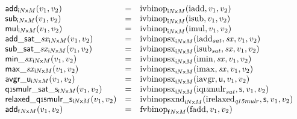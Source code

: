 $$
\begin{array}[t]{@{}lcl@{}l@{}}
{\mathsf{add}}{{}_{{{\mathsf{i}}{N}}{\mathsf{x}}{M}}(v_1, v_2)} & = & {{\mathrm{ivbinop}}}_{{{\mathsf{i}}{N}}{\mathsf{x}}{M}}({\mathrm{iadd}}, v_1, v_2) \\
{\mathsf{sub}}{{}_{{{\mathsf{i}}{N}}{\mathsf{x}}{M}}(v_1, v_2)} & = & {{\mathrm{ivbinop}}}_{{{\mathsf{i}}{N}}{\mathsf{x}}{M}}({\mathrm{isub}}, v_1, v_2) \\
{\mathsf{mul}}{{}_{{{\mathsf{i}}{N}}{\mathsf{x}}{M}}(v_1, v_2)} & = & {{\mathrm{ivbinop}}}_{{{\mathsf{i}}{N}}{\mathsf{x}}{M}}({\mathrm{imul}}, v_1, v_2) \\
{{\mathsf{add\_sat}}{\mathsf{\_}}{{\mathit{sx}}}}{{}_{{{\mathsf{i}}{N}}{\mathsf{x}}{M}}(v_1, v_2)} & = & {{\mathrm{ivbinopsx}}}_{{{\mathsf{i}}{N}}{\mathsf{x}}{M}}({\mathrm{iadd}}_{{\mathit{sat}}}, {\mathit{sx}}, v_1, v_2) \\
{{\mathsf{sub\_sat}}{\mathsf{\_}}{{\mathit{sx}}}}{{}_{{{\mathsf{i}}{N}}{\mathsf{x}}{M}}(v_1, v_2)} & = & {{\mathrm{ivbinopsx}}}_{{{\mathsf{i}}{N}}{\mathsf{x}}{M}}({\mathrm{isub}}_{{\mathit{sat}}}, {\mathit{sx}}, v_1, v_2) \\
{{\mathsf{min}}{\mathsf{\_}}{{\mathit{sx}}}}{{}_{{{\mathsf{i}}{N}}{\mathsf{x}}{M}}(v_1, v_2)} & = & {{\mathrm{ivbinopsx}}}_{{{\mathsf{i}}{N}}{\mathsf{x}}{M}}({\mathrm{imin}}, {\mathit{sx}}, v_1, v_2) \\
{{\mathsf{max}}{\mathsf{\_}}{{\mathit{sx}}}}{{}_{{{\mathsf{i}}{N}}{\mathsf{x}}{M}}(v_1, v_2)} & = & {{\mathrm{ivbinopsx}}}_{{{\mathsf{i}}{N}}{\mathsf{x}}{M}}({\mathrm{imax}}, {\mathit{sx}}, v_1, v_2) \\
{{\mathsf{avgr}}{\mathsf{\_}}{\mathsf{u}}}{{}_{{{\mathsf{i}}{N}}{\mathsf{x}}{M}}(v_1, v_2)} & = & {{\mathrm{ivbinopsx}}}_{{{\mathsf{i}}{N}}{\mathsf{x}}{M}}({\mathrm{iavgr}}, \mathsf{u}, v_1, v_2) \\
{{\mathsf{q{\scriptstyle 15}mulr\_sat}}{\mathsf{\_}}{\mathsf{s}}}{{}_{{{\mathsf{i}}{N}}{\mathsf{x}}{M}}(v_1, v_2)} & = & {{\mathrm{ivbinopsx}}}_{{{\mathsf{i}}{N}}{\mathsf{x}}{M}}({\mathrm{iq{\kern-0.1em\scriptstyle 15\kern-0.1em}mulr}}_{{\mathit{sat}}}, \mathsf{s}, v_1, v_2) \\
{{\mathsf{relaxed\_q{\scriptstyle 15}mulr}}{\mathsf{\_}}{\mathsf{s}}}{{}_{{{\mathsf{i}}{N}}{\mathsf{x}}{M}}(v_1, v_2)} & = & {{\mathrm{ivbinopsxnd}}}_{{{\mathsf{i}}{N}}{\mathsf{x}}{M}}({\mathrm{irelaxed}}_{{\mathit{q{\kern-0.1em\scriptstyle 15\kern-0.1em}mulr}}}, \mathsf{s}, v_1, v_2) \\
{\mathsf{add}}{{}_{{{\mathsf{f}}{N}}{\mathsf{x}}{M}}(v_1, v_2)} & = & {{\mathrm{fvbinop}}}_{{{\mathsf{f}}{N}}{\mathsf{x}}{M}}({\mathrm{fadd}}, v_1, v_2) \\

\end{array}$$
